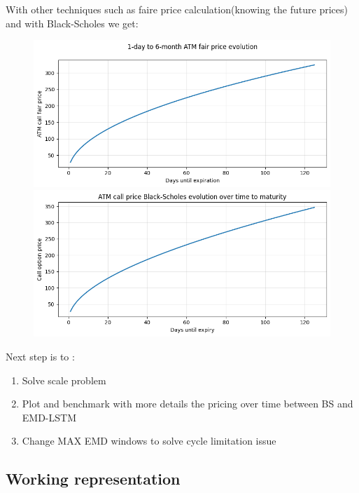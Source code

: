 \documentclass[letterpaper,11pt]{article}
\begin{document}
With other techniques such as faire price calculation(knowing the future prices) and with Black-Scholes we get:
\begin{figure}[H]
    \centering
    \begin{minipage}[b]{0.49\textwidth}
      \centering
      \includegraphics[width=\linewidth]{img/ATM_fair_price.png} 
    \end{minipage}
    \hfill
    \begin{minipage}[b]{0.49\textwidth}
      \centering
      \includegraphics[width=\linewidth]{img/ATM_evo_BS.png}
    \end{minipage}
  \end{figure}

Next step is to :
\begin{enumerate}
  \item Solve scale problem
  \item Plot and benchmark with more details the pricing over time between BS and EMD-LSTM
  \item Change MAX EMD windows to solve cycle limitation issue
\end{enumerate}



\bigskip
\subsection*{Working representation}
\end{document}
